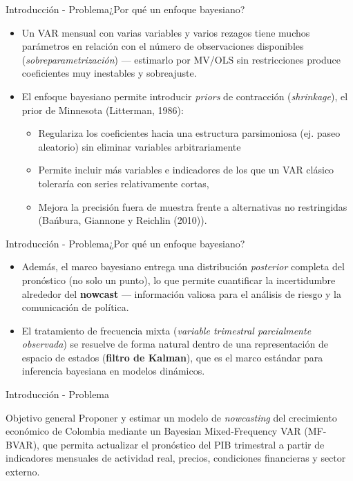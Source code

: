 \documentclass{beamer}
\begin{document}
\begin{frame}{Introducción - Problema}{¿Por qué un enfoque bayesiano?}
\begin{itemize}\justifying
	\item Un VAR mensual con varias variables y varios rezagos tiene muchos parámetros en relación con el número de observaciones disponibles (\textit{sobreparametrización}) — estimarlo por MV/OLS sin restricciones produce coeficientes muy inestables y sobreajuste. \pause
	\item El enfoque bayesiano permite introducir \textit{priors} de contracción (\textit{shrinkage}), el prior de Minnesota (Litterman, 1986):
	
	\begin{itemize}\justifying
		\item Regulariza los coeficientes hacia una estructura parsimoniosa (ej. paseo aleatorio) sin eliminar variables arbitrariamente
		\item Permite incluir más variables e indicadores de los que un VAR clásico toleraría con series relativamente cortas,
		\item Mejora la precisión fuera de muestra frente a alternativas no restringidas (Bańbura, Giannone y Reichlin (2010)).
	\end{itemize}

\end{itemize}
\end{frame}

\begin{frame}{Introducción - Problema}{¿Por qué un enfoque bayesiano?}
\begin{itemize}\justifying
	\item Además, el marco bayesiano entrega una distribución \textit{posterior} completa del pronóstico (no solo un punto), lo que permite cuantificar la incertidumbre alrededor del \textbf{nowcast} — información valiosa para el análisis de riesgo y la comunicación de política. \pause
	\item El tratamiento de frecuencia mixta (\textit{variable trimestral parcialmente observada}) se resuelve de forma natural dentro de una representación de espacio de estados (\textbf{filtro de Kalman}), que es el marco estándar para inferencia bayesiana en modelos dinámicos.
\end{itemize}
\end{frame}

\begin{frame}{Introducción - Problema}
\begin{block}{Objetivo general}\justifying
Proponer y estimar un modelo de \textit{nowcasting} del crecimiento económico de Colombia mediante un Bayesian Mixed-Frequency VAR (MF-BVAR), que permita actualizar el pronóstico del PIB trimestral a partir de indicadores mensuales de actividad real, precios, condiciones financieras y sector externo.
\end{block}
\end{frame}
\end{document}
